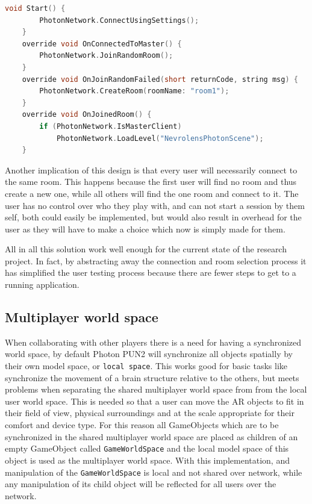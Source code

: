 \begin{lstlisting}[language=c, label={item:photonconnect}, caption={The connect process in a Unity \texttt{MonoBehaviour} written in C\#. }]
    void Start() {
        PhotonNetwork.ConnectUsingSettings();
    }
    override void OnConnectedToMaster() {
        PhotonNetwork.JoinRandomRoom(); 
    }
    override void OnJoinRandomFailed(short returnCode, string msg) {
        PhotonNetwork.CreateRoom(roomName: "room1"); 
    }
    override void OnJoinedRoom() {
        if (PhotonNetwork.IsMasterClient)
            PhotonNetwork.LoadLevel("NevrolensPhotonScene");
    }
\end{lstlisting}

Another implication of this design is that every user will necessarily connect to the same room. This happens because the first user will find no room and thus create a new one, while all others will find the one room and connect to it. The user has no control over who they play with, and can not start a session by them self, both could easily be implemented, but would also result in overhead for the user as they will have to make a choice which now is simply made for them.

All in all this solution work well enough for the current state of the research project. In fact, by abstracting away the connection and room selection process it has simplified the user testing process because there are fewer steps to get to a running application. 


\subsection*{Multiplayer world space}

When collaborating with other players there is a need for having a synchronized world space, by default Photon PUN2 will synchronize all objects spatially by their own model space, or \texttt{local space}. This works good for basic tasks like synchronize the movement of a brain structure relative to the others, but meets problems when separating the shared multiplayer world space from from the local user world space. This is needed so that a user can move the AR objects to fit in their field of view, physical surroundings and at the scale appropriate for their comfort and device type. For this reason all GameObjects which are to be synchronized in the shared multiplayer world space are placed as children of an empty GameObject called \texttt{GameWorldSpace} and the local model space of this object is used as the multiplayer world space. With this implementation, and manipulation of the \texttt{GameWorldSpace} is local and not shared over network, while any manipulation of its child object will be reflected for all users over the network. 

